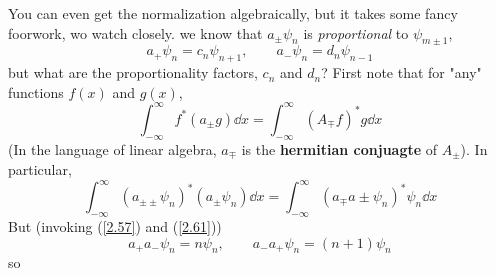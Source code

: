 You can even get the normalization algebraically, but it takes some fancy foorwork, wo watch closely. we know that $a_{\pm}\psi_n$ is \textit{proportional} to $\psi_{m\pm 1}$,
\begin{equation}\label{2.63}
	a_+\psi_n=c_n\psi_{n+1},\qquad a_-\psi_n=d_n\psi_{n-1}	
\end{equation}
but what are the proportionality factors, $c_n$ and $d_n$? First note that for "any" functions $f(x)$ and $g(x)$,
\begin{equation}\label{2.64}
	\int_{-\infty}^\infty f^*(a_{\pm}g)\dd x=\int_{-\infty}^\infty (A_{\mp}f)^*g\dd x
\end{equation}
(In the language of linear algebra, $a_{\mp}$ is the \textbf{hermitian conjuagte} of $A_{\pm}$).
In particular, $$\int_{-\infty}^\infty (a_{\pm\pm}\psi_n)^*(a_{\pm}\psi_n)\dd x=\int_{-\infty}^\infty(a_{\mp}a{\pm}\psi_n)^*\psi_n\dd x $$ But (invoking (\ref{2.57}) and (\ref{2.61}))
\begin{equation}\label{2.65}
	a_+a_-\psi_n=n\psi_n,\qquad a_-a_+\psi_n=(n+1)\psi_n
\end{equation}
so







